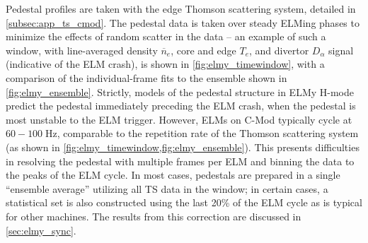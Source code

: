 Pedestal profiles are taken with the edge Thomson scattering system, detailed in \cref{subsec:app_ts_cmod}.  The pedestal data is taken over steady ELMing phases to minimize the effects of random scatter in the data -- an example of such a window, with line-averaged density $\overline{n}_e$, core and edge $T_e$, and divertor $D_\alpha$ signal (indicative of the ELM crash), is shown in \cref{fig:elmy_timewindow}, with a comparison of the individual-frame fits to the ensemble shown in \cref{fig:elmy_ensemble}.  Strictly, models of the pedestal structure in ELMy H-mode predict the pedestal immediately preceding the ELM crash, when the pedestal is most unstable to the ELM trigger.  However, ELMs on C-Mod typically cycle at $60-100 \;\si{\hertz}$, comparable to the repetition rate of the Thomson scattering system (as shown in \cref{fig:elmy_timewindow,fig:elmy_ensemble}).  This presents difficulties in resolving the pedestal with multiple frames per ELM and binning the data to the peaks of the ELM cycle.  In most cases, pedestals are prepared in a single ``ensemble average'' utilizing all TS data in the window; in certain cases, a statistical set is also constructed using the last 20\% of the ELM cycle as is typical for other machines.  The results from this correction are discussed in \cref{sec:elmy_sync}.

\begin{figure}
 \pushtooutside
\end{figure}


